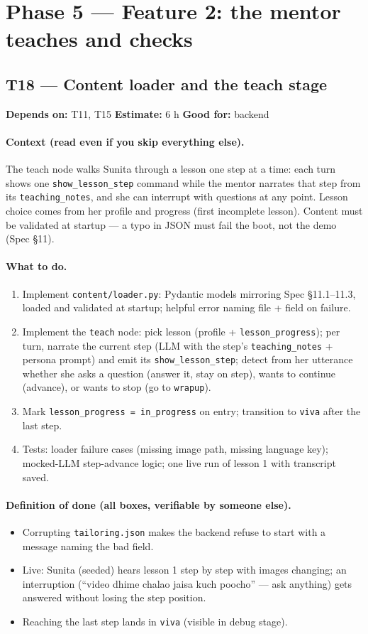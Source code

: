 \documentclass[11pt]{article}
\newcommand{\code}[1]{\texttt{#1}}
\newcommand{\taskmeta}[3]{\noindent\textbf{Depends on:} #1 \quad\textbullet\quad \textbf{Estimate:} #2 \quad\textbullet\quad \textbf{Good for:} #3\par\vspace{2pt}}
\newcommand{\ctx}[1]{\paragraph{Context (read even if you skip everything else).} #1}
\newcommand{\dod}{\paragraph{Definition of done (all boxes, verifiable by someone else).}}
\begin{document}
\section{Phase 5 --- Feature 2: the mentor teaches and checks}

\subsection{T18 --- Content loader and the teach stage}
\taskmeta{T11, T15}{6 h}{backend}
\ctx{The teach node walks Sunita through a lesson one step at a time: each turn shows one \code{show\_lesson\_step} command while the mentor narrates that step from its \code{teaching\_notes}, and she can interrupt with questions at any point. Lesson choice comes from her profile and progress (first incomplete lesson). Content must be validated at startup --- a typo in JSON must fail the boot, not the demo (Spec \S11).}
\paragraph{What to do.}
\begin{enumerate}
  \item Implement \code{content/loader.py}: Pydantic models mirroring Spec \S11.1--11.3, loaded and validated at startup; helpful error naming file + field on failure.
  \item Implement the \code{teach} node: pick lesson (profile + \code{lesson\_progress}); per turn, narrate the current step (LLM with the step's \code{teaching\_notes} + persona prompt) and emit its \code{show\_lesson\_step}; detect from her utterance whether she asks a question (answer it, stay on step), wants to continue (advance), or wants to stop (go to \code{wrapup}).
  \item Mark \code{lesson\_progress = in\_progress} on entry; transition to \code{viva} after the last step.
  \item Tests: loader failure cases (missing image path, missing language key); mocked-LLM step-advance logic; one live run of lesson 1 with transcript saved.
\end{enumerate}
\dod
\begin{itemize}
  \item Corrupting \code{tailoring.json} makes the backend refuse to start with a message naming the bad field.
  \item Live: Sunita (seeded) hears lesson 1 step by step with images changing; an interruption (``video dhime chalao jaisa kuch poocho'' --- ask anything) gets answered without losing the step position.
  \item Reaching the last step lands in \code{viva} (visible in debug stage).
\end{itemize}
\end{document}

